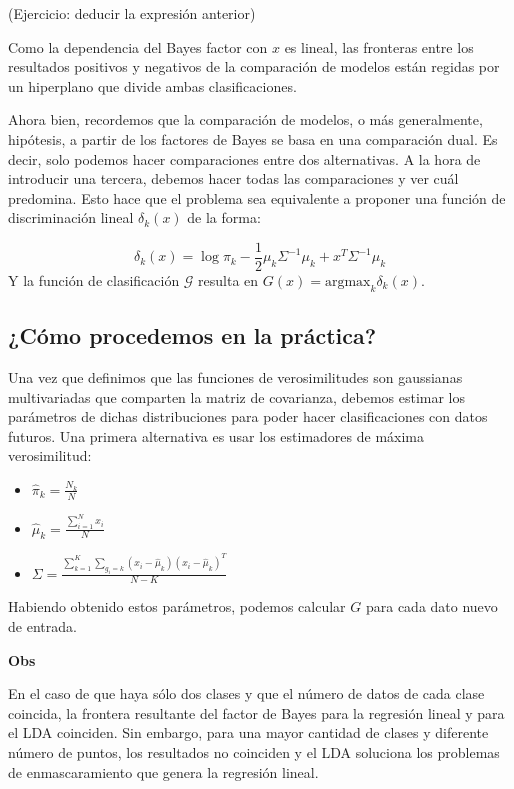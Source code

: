 \documentclass[aps,onecolumn,12pt,notitlepage]{revtex4-1}
\begin{document}
(Ejercicio: deducir la expresión anterior)

Como la dependencia del Bayes factor con \(x\) es lineal, las fronteras entre los resultados positivos y negativos de la comparación de modelos están regidas por un hiperplano que divide ambas clasificaciones.

Ahora bien, recordemos que la comparación de modelos, o más generalmente, hipótesis, a partir de los factores de Bayes se basa en una comparación dual. Es decir, solo podemos hacer comparaciones entre dos alternativas. A la hora de introducir una tercera, debemos hacer todas las comparaciones y ver cuál predomina. Esto hace que el problema sea equivalente a proponer una función de discriminación lineal \(\delta_k(x)\) de la forma:

\[
\delta_k(x) = \log \pi_k -\frac{1}{2} \mu_k \Sigma^{-1}\mu_k + x^T\Sigma^{-1}\mu_k
\]
Y la función de clasificación $\mathcal{G}$ resulta en $G(x) = \text{argmax}_{k} \delta_{k}(x)$.

\subsection*{¿Cómo procedemos en la práctica?}

Una vez que definimos que las funciones de verosimilitudes son gaussianas multivariadas que comparten la matriz de covarianza, debemos estimar los parámetros de dichas distribuciones para poder hacer clasificaciones con datos futuros. Una primera alternativa es usar los estimadores de máxima verosimilitud:

\begin{itemize}
  \item $\hat{\pi}_{k} = \frac{N_{k}}{N}$
  \item $\hat{\mu}_{k} = \frac{\sum_{i=1}^{N} x_{i}}{N}$
  \item $\Sigma = \frac{\sum_{k=1}^{K} \sum_{g_{i}=k} (x_{i}-\hat{\mu}_{k})(x_{i}-\hat{\mu}_{k})^{T}}{N-K}$
\end{itemize}

Habiendo obtenido estos parámetros, podemos calcular $G$ para cada dato nuevo de entrada.

\textbf{Obs}

En el caso de que haya sólo dos clases y que el número de datos de cada clase coincida, la frontera resultante del factor de Bayes para la regresión lineal y para el LDA coinciden. Sin embargo, para una mayor cantidad de clases y diferente número de puntos, los resultados no coinciden y el LDA soluciona los problemas de enmascaramiento que genera la regresión lineal.
\end{document}
